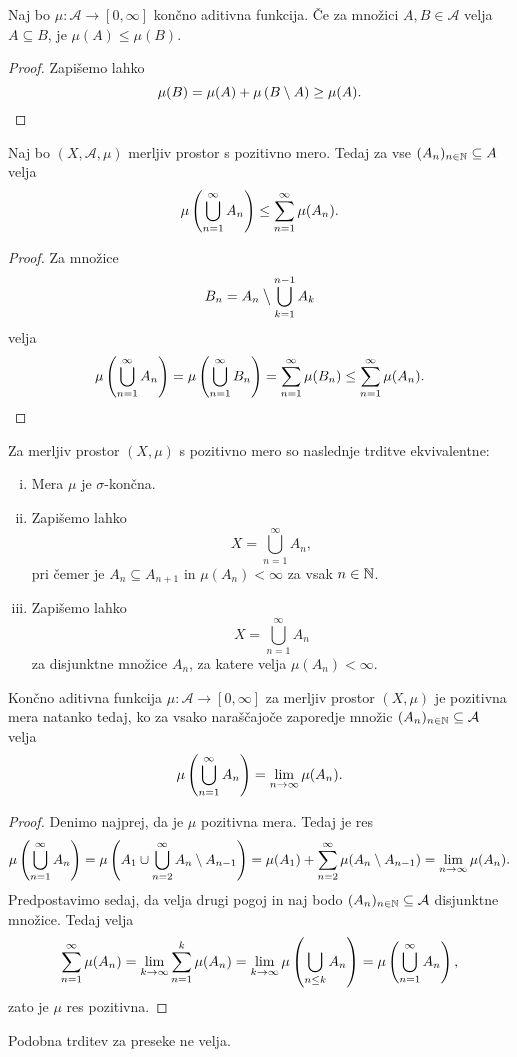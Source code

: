 \begin{lema}
Naj bo $\mu \colon \mathcal{A} \to [0, \infty]$ končno aditivna
funkcija. Če za množici $A, B \in \mathcal{A}$ velja
$A \subseteq B$, je $\mu(A) \leq \mu(B)$.
\end{lema}

\begin{proof}
Zapišemo lahko
\[
\mu(B) = \mu(A) + \mu \left(B \setminus A\right) \geq \mu(A). \qedhere
\]
\end{proof}

\begin{trditev}
Naj bo $(X, \mathcal{A}, \mu)$ merljiv prostor s pozitivno mero.
Tedaj za vse $(A_n)_{n \in \mathbb{N}} \subseteq A$ velja
\[
\mu \left(\bigcup_{n=1}^\infty A_n\right) \leq \sum_{n=1}^\infty \mu(A_n).
\]
\end{trditev}

\begin{proof}
Za množice
\[
B_n = A_n \mathbin{\big\backslash} \bigcup_{k=1}^{n-1} A_k
\]
velja
\[
\mu \left(\bigcup_{n=1}^\infty A_n\right) =
\mu \left(\bigcup_{n=1}^\infty B_n\right) =
\sum_{n=1}^\infty \mu(B_n) \leq
\sum_{n=1}^\infty \mu(A_n). \qedhere
\]
\end{proof}

\begin{trditev}
Za merljiv prostor $(X, \mu)$ s pozitivno mero so naslednje trditve
ekvivalentne:

\begin{enumerate}[i)]
\item Mera $\mu$ je $\sigma$-končna.
\item Zapišemo lahko
\[
X = \bigcup_{n=1}^\infty A_n,
\]
pri čemer je $A_n \subseteq A_{n+1}$ in $\mu(A_n) < \infty$ za vsak
$n \in \mathbb{N}$.
\item Zapišemo lahko
\[
X = \bigcup_{n=1}^\infty A_n
\]
za disjunktne množice $A_n$, za katere velja $\mu(A_n) < \infty$.
\end{enumerate}
\end{trditev}

\obvs

\begin{trditev}
Končno aditivna funkcija $\mu \colon \mathcal{A} \to [0, \infty]$
za merljiv prostor $(X, \mu)$ je pozitivna mera natanko tedaj, ko
za vsako naraščajoče zaporedje množic
$(A_n)_{n \in \mathbb{N}} \subseteq \mathcal{A}$ velja
\[
\mu \left(\bigcup_{n=1}^\infty A_n\right) = \lim_{n \to \infty} \mu(A_n).
\]
\end{trditev}

\begin{proof}
Denimo najprej, da je $\mu$ pozitivna mera. Tedaj je res
\[
\mu \left(\bigcup_{n=1}^\infty A_n\right) =
\mu \left(A_1 \cup \bigcup_{n=2}^\infty A_n \setminus A_{n-1}\right) =
\mu(A_1) + \sum_{n=2}^\infty \mu(A_n \setminus A_{n-1}) =
\lim_{n \to \infty} \mu(A_n).
\]
Predpostavimo sedaj, da velja drugi pogoj in naj bodo
$(A_n)_{n \in \mathbb{N}} \subseteq \mathcal{A}$ disjunktne množice. Tedaj
velja
\[
\sum_{n=1}^\infty \mu(A_n) =
\lim_{k \to \infty} \sum_{n=1}^k \mu(A_n) =
\lim_{k \to \infty} \mu \left(\bigcup_{n \leq k} A_n\right) =
\mu \left(\bigcup_{n=1}^\infty A_n\right),
\]
zato je $\mu$ res pozitivna.
\end{proof}

\begin{opomba}
Podobna trditev za preseke ne velja.
\end{opomba}
